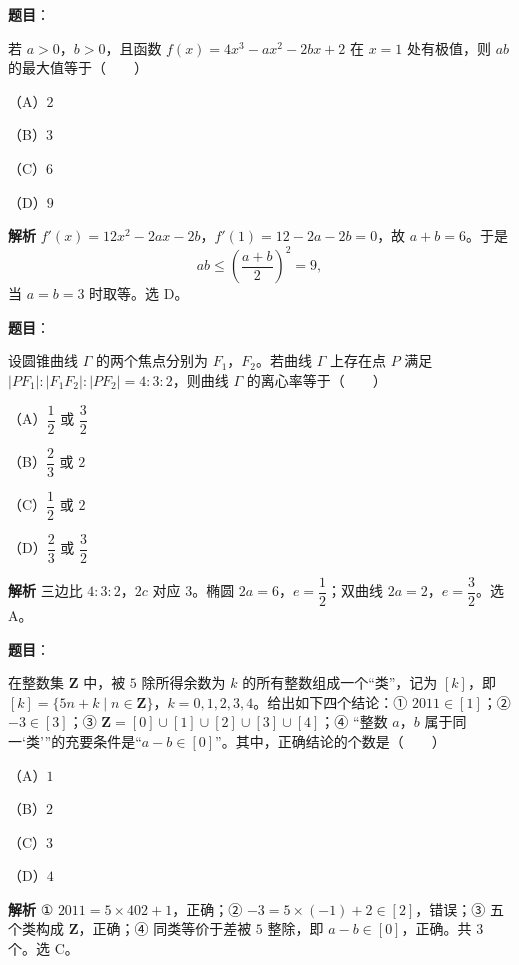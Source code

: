 \begin{answer}

\textbf{题目}：

若 $a>0$，$b>0$，且函数 $f(x)=4x^3-ax^2-2bx+2$ 在 $x=1$ 处有极值，则 $ab$ 的最大值等于\mbox{（　　）}

（A）$2$

（B）$3$

（C）$6$

（D）$9$

\textbf{解析}
$f'(x)=12x^2-2ax-2b$，$f'(1)=12-2a-2b=0$，故 $a+b=6$。于是
\nopagebreak[4]
\[ab\leqslant\left(\frac{a+b}2\right)^2=9,\]
当 $a=b=3$ 时取等。选 D。


\end{answer}
\begin{answer}

\textbf{题目}：

设圆锥曲线 $\Gamma$ 的两个焦点分别为 $F_1$，$F_2$。若曲线 $\Gamma$ 上存在点 $P$ 满足 $|PF_1|:|F_1F_2|:|PF_2|=4:3:2$，则曲线 $\Gamma$ 的离心率等于\mbox{（　　）}

（A）$\dfrac12$ 或 $\dfrac32$

（B）$\dfrac23$ 或 $2$

（C）$\dfrac12$ 或 $2$

（D）$\dfrac23$ 或 $\dfrac32$

\textbf{解析}
三边比 $4:3:2$，$2c$ 对应 $3$。椭圆 $2a=6$，$e=\dfrac12$；双曲线 $2a=2$，$e=\dfrac32$。选 A。


\end{answer}
\begin{answer}

\textbf{题目}：

在整数集 $\mathbf Z$ 中，被 $5$ 除所得余数为 $k$ 的所有整数组成一个“类”，记为 $[k]$，即 $[k]=\{5n+k\mid n\in\mathbf Z\}$，$k=0,1,2,3,4$。给出如下四个结论：① $2011\in[1]$；② $-3\in[3]$；③ $\mathbf Z=[0]\cup[1]\cup[2]\cup[3]\cup[4]$；④ “整数 $a$，$b$ 属于同一‘类’”的充要条件是“$a-b\in[0]$”。其中，正确结论的个数是\mbox{（　　）}

（A）$1$

（B）$2$

（C）$3$

（D）$4$

\textbf{解析}
① $2011=5\times402+1$，正确；② $-3=5\times(-1)+2\in[2]$，错误；③ 五个类构成 $\mathbf Z$，正确；④ 同类等价于差被 $5$ 整除，即 $a-b\in[0]$，正确。共 $3$ 个。选 C。


\end{answer}
